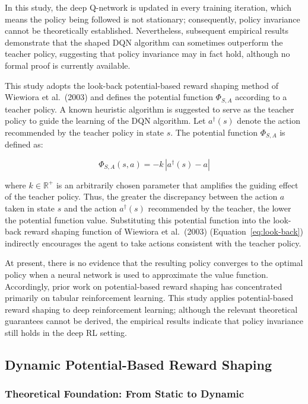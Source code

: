 In this study, the deep Q-network is updated in every training iteration, which means the policy being followed is not stationary; consequently, policy invariance cannot be theoretically established. Nevertheless, subsequent empirical results demonstrate that the shaped DQN algorithm can sometimes outperform the teacher policy, suggesting that policy invariance may in fact hold, although no formal proof is currently available.

This study adopts the look-back potential-based reward shaping method of Wiewiora et al.\ (2003) and defines the potential function $\Phi_{S,A}$ according to a teacher policy. A known heuristic algorithm is suggested to serve as the teacher policy to guide the learning of the DQN algorithm. Let $a^{\dagger}(s)$ denote the action recommended by the teacher policy in state $s$. The potential function $\Phi_{S,A}$ is defined as:

\begin{equation}
\Phi_{S,A}(s, a) = -k \, |a^{\dagger}(s) - a| \label{eq:potential}
\end{equation}

where $k \in \mathbb{R}^{+}$ is an arbitrarily chosen parameter that amplifies the guiding effect of the teacher policy. Thus, the greater the discrepancy between the action $a$ taken in state $s$ and the action $a^{\dagger}(s)$ recommended by the teacher, the lower the potential function value. Substituting this potential function into the look-back reward shaping function of Wiewiora et al.\ (2003) (Equation~\eqref{eq:look-back}) indirectly encourages the agent to take actions consistent with the teacher policy.

At present, there is no evidence that the resulting policy converges to the optimal policy when a neural network is used to approximate the value function. Accordingly, prior work on potential-based reward shaping has concentrated primarily on tabular reinforcement learning. This study applies potential-based reward shaping to deep reinforcement learning; although the relevant theoretical guarantees cannot be derived, the empirical results indicate that policy invariance still holds in the deep RL setting.

\subsection{Dynamic Potential-Based Reward Shaping}

\subsubsection{Theoretical Foundation: From Static to Dynamic}

